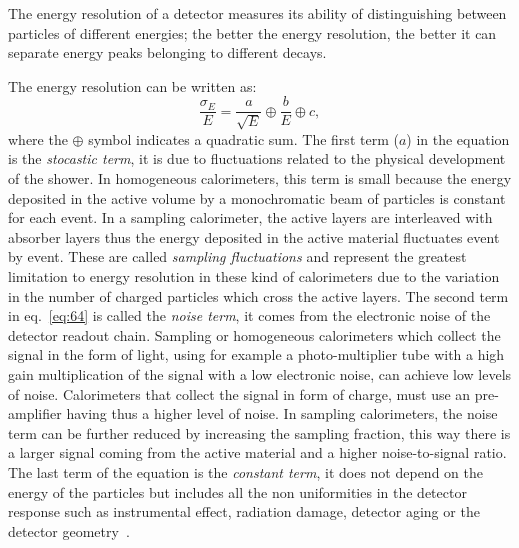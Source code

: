 The energy resolution of a detector measures its ability of distinguishing
between particles of different energies; the better the energy resolution, the
better it can separate energy peaks belonging to different decays.

The energy resolution can be written as:
\begin{equation}
  \label{eq:64}
  \frac{\sigma_E}{E} = \frac{a}{\sqrt{E}} \oplus \frac{b}{E} \oplus c,
\end{equation}
where the $\oplus$ symbol indicates a quadratic sum. The first term ($a$) in the
equation is the \emph{stocastic term}, it is due to fluctuations related to the
physical development of the shower. In homogeneous calorimeters, this term is
small because the energy deposited in the active volume by a monochromatic beam
of particles is constant for each event. In a sampling calorimeter, the active
layers are interleaved with absorber layers thus the energy deposited in the
active material fluctuates event by event. These are called \emph{sampling
  fluctuations} and represent the greatest limitation to energy resolution in
these kind of calorimeters due to the variation in the number of charged
particles which cross the active layers. The second term in eq.~\eqref{eq:64} is
called the \emph{noise term}, it comes from the electronic noise of the detector
readout chain. Sampling or homogeneous calorimeters which collect the signal in
the form of light, using for example a photo-multiplier tube with a high gain
multiplication of the signal with a low electronic noise, can achieve low levels
of noise. Calorimeters that collect the signal in form of charge, must use an
pre-amplifier having thus a higher level of noise. In sampling calorimeters, the
noise term can be further reduced by increasing the sampling fraction, this way
there is a larger signal coming from the active material and a higher
noise-to-signal ratio. The last term of the equation is the \emph{constant
  term}, it does not depend on the energy of the particles but includes all the
non uniformities in the detector response such as instrumental effect, radiation
damage, detector aging or the detector geometry~\cite{Calorimetry}.
